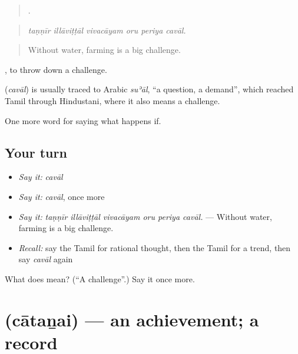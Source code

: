 \begin{quote}
     .
\end{quote}

\begin{quote}
\emph{taṇṇīr illāviṭṭāl vivacāyam oru periya cavāl.}
\end{quote}

\begin{quote}
Without water, farming is a big challenge.
\end{quote}

 , to throw down a challenge.

\begin{cousinweb}
\textbf{} (\emph{cavāl}) is usually traced to Arabic \emph{suʾāl}, \textquotedblleft{}a question, a demand\textquotedblright{}, which reached Tamil through Hindustani, where it also means a challenge.
\end{cousinweb}

\begin{grammarlens}[title={What you've built}]
One more word for saying what happens if.
\end{grammarlens}

\subsection*{Your turn}
\begin{itemize}
\raggedright
  \item \emph{Say it:} \emph{cavāl}
  \item \emph{Say it:} \emph{cavāl}, once more
  \item \emph{Say it:} \emph{taṇṇīr illāviṭṭāl vivacāyam oru periya cavāl.} — Without water, farming is a big challenge.
  \item \emph{Recall:} say the Tamil for rational thought, then the Tamil for a trend, then say \emph{cavāl} again
\end{itemize}

\begin{tcolorbox}[breakable,colback=teal!4,colframe=teal!35!black,title={Before you move on}]
What does  mean? (\textquotedblleft{}A challenge\textquotedblright{}.) Say it once more.
\end{tcolorbox}
\section[\texorpdfstring{\ta{சாதனை} (cātaṉai)}{சாதனை (cātaṉai)}]{ (cātaṉai) — an achievement; a record}

